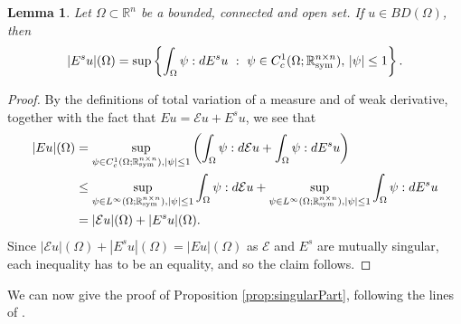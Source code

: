 \documentclass[a4paper,11pt,oneside,notitlepage]{article}
\newtheorem{lemma}[theorem]{Lemma}
\numberwithin{equation}{section}
\def\R{\mathbb{R}}
\def\sym{{\rm sym}}
\newcommand{\E}{\mathcal{E}}
\newcommand{\st}{ \ : \ }
\begin{document}
\begin{lemma}
\label{lem:singularPart}
    Let $\Omega \subset \R^n$ be a bounded, connected and open set. If $u \in BD(\Omega)$, then
    \begin{equation*}
        |E^s u|(\Omega) = \sup \left\{ \int_\Omega \psi : dE^su \st \psi \in C^1_c(\Omega; \R^{n \times n}_\sym), \, |\psi| \le 1 \right\}.
    \end{equation*}
\end{lemma}
\begin{proof}
    By the definitions of total variation of a measure and of weak derivative, together with the fact that $Eu = \E u + E^s u$, we see that
    \begin{equation*}
    \begin{aligned}
        |Eu|(\Omega)
        &= \sup_{\psi \in C^1_c(\Omega; \R^{n \times n}_\sym), |\psi| \le 1} \left( \int_\Omega \psi : d\E u + \int_\Omega \psi : dE^su \right) \\
        &\le \sup_{\psi \in L^\infty(\Omega; \R^{n \times n}_\sym), |\psi| \le 1} \int_\Omega \psi : d \E u + \sup_{\psi \in L^\infty(\Omega; \R^{n \times n}_\sym), |\psi| \le 1} \int_\Omega \psi : dE^su \\
        &= 
        |\E u|(\Omega) + |E^su|(\Omega). 
    \end{aligned}
    \end{equation*}
    Since $|\E u|(\Omega) + |E^su|(\Omega) = |Eu|(\Omega)$ as $\E$ and $E^s$ are mutually singular, each inequality has to be an equality, and so the claim follows.
\end{proof}

We can now give the proof of Proposition \ref{prop:singularPart}, following the lines of \cite[Proposition 6.2]{EHH}.
\end{document}
